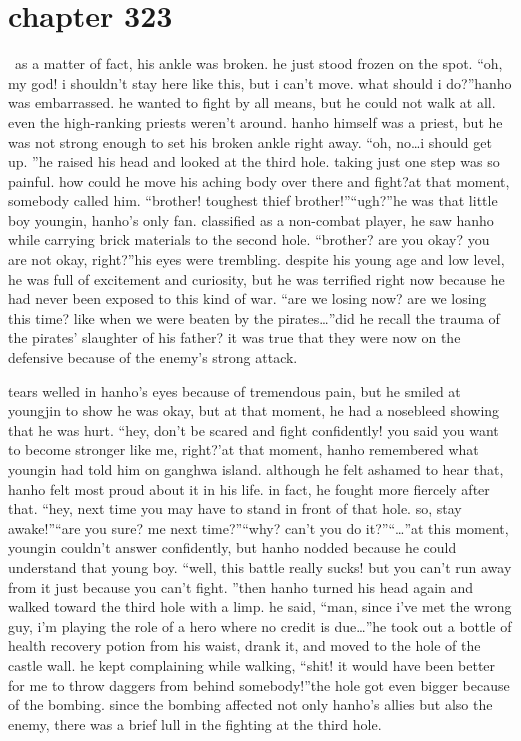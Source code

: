 \section{chapter 323}






 as a matter of fact, his ankle was broken.
 he just stood frozen on the spot.
“oh, my god! i shouldn’t stay here like this, but i can’t move.
 what should i do?”hanho was embarrassed.
 he wanted to fight by all means, but he could not walk at all.
even the high-ranking priests weren’t around.
 hanho himself was a priest, but he was not strong enough to set his broken ankle right away.
“oh, no…i should get up.
”he raised his head and looked at the third hole.
 taking just one step was so painful.
 how could he move his aching body over there and fight?at that moment, somebody called him.
“brother! toughest thief brother!”“ugh?”he was that little boy youngin, hanho’s only fan.
 classified as a non-combat player, he saw hanho while carrying brick materials to the second hole.
“brother? are you okay? you are not okay, right?”his eyes were trembling.
 despite his young age and low level, he was full of excitement and curiosity, but he was terrified right now because he had never been exposed to this kind of war.
“are we losing now? are we losing this time? like when we were beaten by the pirates…”did he recall the trauma of the pirates’ slaughter of his father? it was true that they were now on the defensive because of the enemy’s strong attack.

tears welled in hanho’s eyes because of tremendous pain, but he smiled at youngjin to show he was okay, but at that moment, he had a nosebleed showing that he was hurt.
“hey, don’t be scared and fight confidently! you said you want to become stronger like me, right?’at that moment, hanho remembered what youngin had told him on ganghwa island.
although he felt ashamed to hear that, hanho felt most proud about it in his life.
 in fact, he fought more fiercely after that.
“hey, next time you may have to stand in front of that hole.
 so, stay awake!”“are you sure? me next time?”“why? can’t you do it?”“…”at this moment, youngin couldn’t answer confidently, but hanho nodded because he could understand that young boy.
“well, this battle really sucks! but you can’t run away from it just because you can’t fight.
”then hanho turned his head again and walked toward the third hole with a limp.
he said, “man, since i’ve met the wrong guy, i’m playing the role of a hero where no credit is due…”he took out a bottle of health recovery potion from his waist, drank it, and moved to the hole of the castle wall.
 he kept complaining while walking, “shit! it would have been better for me to throw daggers from behind somebody!”the hole got even bigger because of the bombing.
 since the bombing affected not only hanho’s allies but also the enemy, there was a brief lull in the fighting at the third hole.

